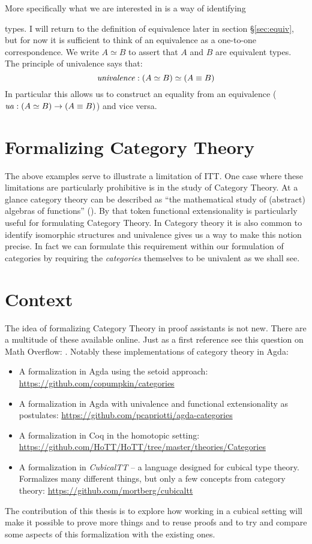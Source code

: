 More specifically what we are interested in is a way of identifying

 types. I will return to the definition of
equivalence later in section \S\ref{sec:equiv}, but for now it is
sufficient to think of an equivalence as a one-to-one correspondence.
We write $A \simeq B$ to assert that $A$ and $B$ are equivalent types.
The principle of univalence says that:
%
$$\mathit{univalence} \mathrel{:} (A \simeq B) \simeq (A \equiv B)$$
%
In particular this allows us to construct an equality from an equivalence
($\mathit{ua} \mathrel{:} (A \simeq B) \to (A \equiv B)$) and vice versa.

\section{Formalizing Category Theory}
%
The above examples serve to illustrate a limitation of ITT. One case where these
limitations are particularly prohibitive is in the study of Category Theory. At
a glance category theory can be described as ``the mathematical study of
(abstract) algebras of functions'' (\cite{awodey-2006}). By that token
functional extensionality is particularly useful for formulating Category
Theory. In Category theory it is also common to identify isomorphic structures
and univalence gives us a way to make this notion precise. In fact we can
formulate this requirement within our formulation of categories by requiring the
\emph{categories} themselves to be univalent as we shall see.

\section{Context}
\label{sec:context}
%
The idea of formalizing Category Theory in proof assistants is not new. There
are a multitude of these available online. Just as a first reference see this
question on Math Overflow: \cite{mo-formalizations}. Notably these
implementations of category theory in Agda:
%
\begin{itemize}
\item
  A formalization in Agda using the setoid approach:
  \url{https://github.com/copumpkin/categories}
\item
  A formalization in Agda with univalence and functional
  extensionality as postulates:
  \url{https://github.com/pcapriotti/agda-categories}
\item
  A formalization in Coq in the homotopic setting:
  \url{https://github.com/HoTT/HoTT/tree/master/theories/Categories}
\item
  A formalization in \emph{CubicalTT} -- a language designed for
  cubical type theory. Formalizes many different things, but only a
  few concepts from category theory:
  \url{https://github.com/mortberg/cubicaltt}
\end{itemize}
%
The contribution of this thesis is to explore how working in a cubical setting
will make it possible to prove more things and to reuse proofs and to try and
compare some aspects of this formalization with the existing ones.

